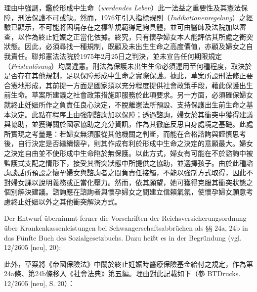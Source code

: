 \documentclass[12pt]{article}
\begin{document}
\begin{transpara}
理由中強調，鑑於形成中生命（\textit{werdendes Leben}）此一法益之重要性及其憲法保障，刑法保護不可或缺。然而，1976年引入指標規則（\textit{Indikationenregelung}）之經驗已顯示，不可能將困境存在之標準規範得足夠具體，並可由醫師及法院加以審查，以作為終止妊娠之正當化依據。終究，只有懷孕婦女本人能評估其所處之衝突狀態。因此，必須尋找一種規制，既顧及未出生生命之高度價值，亦顧及婦女之自我責任。聯邦憲法法院於1975年2月25日之判決，並未宣告任何期限規定（\textit{Fristenlösung}）均屬違憲。刑法為保護未出生生命必須運用至何種程度，取決於是否存在其他規制，足以保障形成中生命之實際保護。據此，草案所設刑法修正要合憲地形成，其前提一方面是國家須以充分程度提供社會政策手段，藉此保護出生前生命。草案所建議之社會政策措施即服務於此項要求。另一方面，必須確保婦女就終止妊娠所作之負責任良心決定，不脫離憲法所預設、支持保護出生前生命之基本決定。此點在程序上由強制諮詢加以保障；透過諮詢，婦女於其衝突中獲得建議與協助，並獲得關於國家協助之充分資訊，作為其徹底反思自身處境之基礎。此處所實現之考量是：若婦女無須服從其他機關之判斷，而能在合格諮詢與謹慎思考後，自行決定是否繼續懷孕，則其作成有利於形成中生命之決定的意願最大。婦女之決定自由並不使形成中生命陷於無保護。以此方式，婦女有可能在不於諮詢中被監護式支配之情形下，接受其衝突狀態中所提供之協助，並選擇孩子。由於此種諮詢談話所預設之懷孕婦女與諮詢者之間負責任接觸，不能以強制方式取得，因此不對婦女課以說明義務或正當化壓力。然而，依其願望，她可獲得克服其衝突狀態之個別解決建議。諮詢應在諮詢者與懷孕婦女之間建立信賴氣氛，使懷孕婦女願意考慮終止妊娠以外之其他衝突解決方式。
\end{transpara}

\begin{sourcepara}[title={原文理由 A.II.2.a 引文}]
Der Entwurf übernimmt ferner die Vorschriften der Reichsversicherungsordnung über Krankenkassenleistungen bei Schwangerschaftsabbrüchen als §§ 24a, 24b in das Fünfte Buch des Sozialgesetzbuchs. Dazu heißt es in der Begründung (vgl. \abbrBTDrucks{} 12/2605 [neu], \abbrS{} 20):
\end{sourcepara}
\begin{transpara}
此外，草案將《帝國保險法》中關於終止妊娠時醫療保險基金給付之規定，作為第24a條、第24b條移入《社會法典》第五編。理由對此記載如下（參 BTDrucks. 12/2605 [neu], S. 20）：
\end{transpara}
\end{document}

